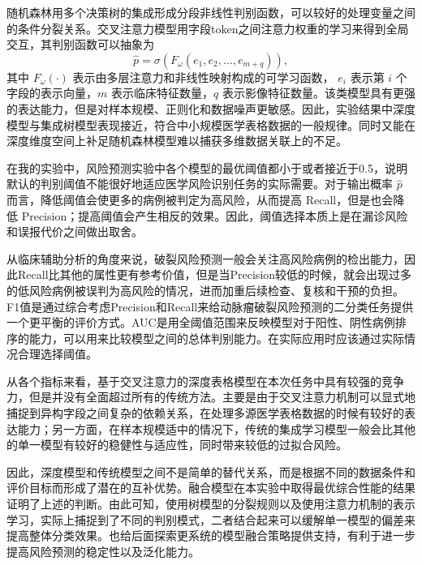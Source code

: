 随机森林用多个决策树的集成形成分段非线性判别函数，可以较好的处理变量之间的条件分裂关系。交叉注意力模型用字段token之间注意力权重的学习来得到全局交互，其判别函数可以抽象为
\begin{equation}
\hat{p}=\sigma\left(F_{\omega}(e_1,e_2,\ldots,e_{m+q})\right),
\label{eq:cross-attn-risk}
\end{equation}
其中 $F_{\omega}(\cdot)$ 表示由多层注意力和非线性映射构成的可学习函数， $e_i$ 表示第 $i$ 个字段的表示向量，$m$ 表示临床特征数量，$q$ 表示影像特征数量。该类模型具有更强的表达能力，但是对样本规模、正则化和数据噪声更敏感。因此，实验结果中深度模型与集成树模型表现接近，符合中小规模医学表格数据的一般规律。同时又能在深度维度空间上补足随机森林模型难以捕获多维数据关联上的不足。


在我的实验中，风险预测实验中各个模型的最优阈值都小于或者接近于0.5，说明默认的判别阈值不能很好地适应医学风险识别任务的实际需要。对于输出概率 $\hat{p}$ 而言，降低阈值会使更多的病例被判定为高风险，从而提高 Recall，但是也会降低 Precision；提高阈值会产生相反的效果。因此，阈值选择本质上是在漏诊风险和误报代价之间做出取舍。

从临床辅助分析的角度来说，破裂风险预测一般会关注高风险病例的检出能力，因此Recall比其他的属性更有参考价值，但是当Precision较低的时候，就会出现过多的低风险病例被误判为高风险的情况，进而加重后续检查、复核和干预的负担。F1值是通过综合考虑Precision和Recall来给动脉瘤破裂风险预测的二分类任务提供一个更平衡的评价方式。AUC是用全阈值范围来反映模型对于阳性、阴性病例排序的能力，可以用来比较模型之间的总体判别能力。在实际应用时应该通过实际情况合理选择阈值。



从各个指标来看，基于交叉注意力的深度表格模型在本次任务中具有较强的竞争力，但是并没有全面超过所有的传统方法。主要是由于交叉注意力机制可以显式地捕捉到异构字段之间复杂的依赖关系，在处理多源医学表格数据的时候有较好的表达能力；另一方面，在样本规模适中的情况下，传统的集成学习模型一般会比其他的单一模型有较好的稳健性与适应性，同时带来较低的过拟合风险。

因此，深度模型和传统模型之间不是简单的替代关系，而是根据不同的数据条件和评价目标而形成了潜在的互补优势。融合模型在本实验中取得最优综合性能的结果证明了上述的判断。由此可知，使用树模型的分裂规则以及使用注意力机制的表示学习，实际上捕捉到了不同的判别模式，二者结合起来可以缓解单一模型的偏差来提高整体分类效果。也给后面探索更系统的模型融合策略提供支持，有利于进一步提高风险预测的稳定性以及泛化能力。


